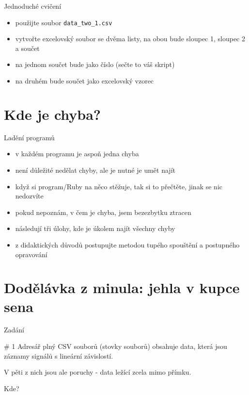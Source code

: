 \documentclass{beamer}
\begin{document}
\begin{frame}{Jednoduché cvičení}
  \begin{itemize}
    \item použijte soubor \texttt{data\_two\_1.csv}
    \item vytvořte excelovský soubor se dvěma listy, na obou bude sloupec 1, sloupec 2 a součet
    \item na jednom součet bude jako číslo (sečte to váš skript)
    \item na druhém bude součet jako excelovský vzorec
  \end{itemize}
\end{frame}


\section{Kde je chyba?}

\begin{frame}{Ladění programů}
  \begin{itemize}
    \item v každém programu je aspoň jedna chyba
    \item není důležité nedělat chyby, ale je nutné je umět najít
    \item když si program/Ruby na něco stěžuje, tak si to přečtěte, jinak se nic nedozvíte
    \item pokud nepoznám, v čem je chyba, jsem bezezbytku ztracen
    \item následují tři úlohy, kde je úkolem najít všechny chyby
    \item z didaktických důvodů postupujte metodou tupého spouštění a postupného opravování
  \end{itemize}
\end{frame}

\section{Dodělávka z minula: jehla v kupce sena}

\begin{frame}{Zadání}
  \begin{block}{\# 1}
    Adresář plný CSV souborů (stovky souborů) obsahuje data, která jsou záznamy signálů s lineární závislostí.
    
    V pěti z nich jsou ale poruchy - data ležící zcela mimo přímku.
    
    Kde?
  \end{block}
\end{frame}
\end{document}
